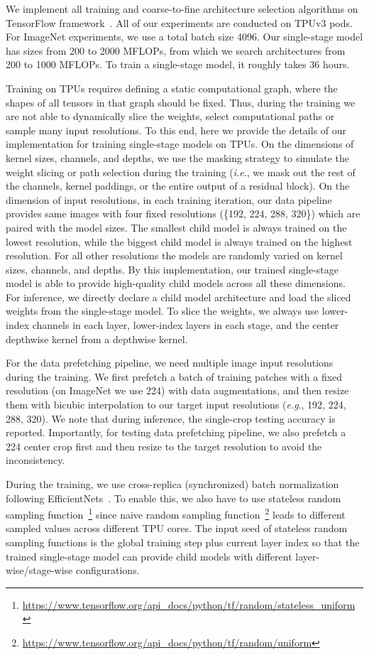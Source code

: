\documentclass[runningheads]{llncs}
\def\onedot{.}
\def\eg{\emph{e.g}\onedot} \def\Eg{\emph{E.g}\onedot}
\def\ie{\emph{i.e}\onedot} \def\Ie{\emph{I.e}\onedot}
\begin{document}
We implement all training and coarse-to-fine architecture selection algorithms on TensorFlow framework~\cite{tensorflow2015-whitepaper}. All of our experiments are conducted on  TPUv3 pods. For ImageNet experiments, we use a total batch size 4096. Our single-stage model has sizes from 200 to 2000 MFLOPs, from which we search architectures from 200 to 1000 MFLOPs. To train a single-stage model, it roughly takes 36 hours.

Training on TPUs requires defining a static computational graph, where the shapes of all tensors in that graph should be fixed. Thus, during the training we are not able to dynamically slice the weights, select computational paths or sample many input resolutions. To this end, here we provide the details of our implementation for training single-stage models on TPUs. On the dimensions of kernel sizes, channels, and depths, we use the masking strategy to simulate the weight slicing or path selection during the training (\ie, we mask out the rest of the channels, kernel paddings, or the entire output of a residual block). On the dimension of input resolutions, in each training iteration, our data pipeline provides same images with four fixed resolutions (\{192, 224, 288, 320\}) which are paired with the model sizes. The smallest child model is always trained on the lowest resolution, while the biggest child model is always trained on the highest resolution. For all other resolutions the models are randomly varied on kernel sizes, channels, and depths. By this implementation, our trained single-stage model is able to provide high-quality child models across all these dimensions. For inference, we directly declare a child model architecture and load the sliced weights from the single-stage model. To slice the weights, we always use lower-index channels in each layer, lower-index layers in each stage, and the center  depthwise kernel from a  depthwise kernel.

For the data prefetching pipeline, we need multiple image input resolutions during the training. We first prefetch a batch of training patches with a fixed resolution (on ImageNet we use 224) with data augmentations, and then resize them with bicubic interpolation to our target input resolutions (\eg, 192, 224, 288, 320). We note that during inference, the single-crop testing accuracy is reported. Importantly, for testing data prefetching pipeline, we also prefetch a 224 center crop first and then resize to the target resolution to avoid the inconsistency.

During the training, we use cross-replica (synchronized) batch normalization following EfficientNets~\cite{tan2019efficientnet}. To enable this, we also have to use stateless random sampling function~\footnote{\url{https://www.tensorflow.org/api_docs/python/tf/random/stateless_uniform}} since naive random sampling function~\footnote{\url{https://www.tensorflow.org/api_docs/python/tf/random/uniform}} leads to different sampled values across different TPU cores. The input seed of stateless random sampling functions is the global training step plus current layer index so that the trained single-stage model can provide child models with different layer-wise/stage-wise configurations.

  
\end{document}
